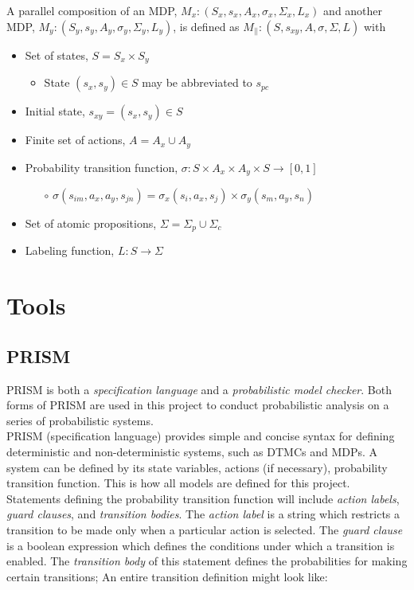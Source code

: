 \documentclass{article}
\begin{document}
\newpage

A parallel composition of an MDP, $M_x: (S_x, s_x, A_x, \sigma_x, \Sigma_x, L_x)$ and another MDP, $M_y: (S_y, s_y, A_y, \sigma_y, \Sigma_y, L_y)$, is defined as 
$M_{||}: (S, s_{xy}, A, \sigma, \Sigma, L)$ with
\begin{itemize}
    \setlength\itemsep{0em}
    \item Set of states, $S=S_x \times S_y$
        \begin{itemize}
            \item State $(s_x,s_y)\in S$ may be abbreviated to $s_{pc}$
        \end{itemize}
    \item Initial state, $s_{xy} = (s_x,s_y) \in S$
    \item Finite set of actions, $A=A_x\cup A_y$
    \item Probability transition function, $\sigma: S \times A_x \times A_y \times S \rightarrow [0, 1]$
        \begin{itemize}
            \item[$\circ$] $\sigma(s_{im}, a_x, a_y, s_{jn})=\sigma_x(s_i, a_x, s_j) \times \sigma_y(s_m, a_y, s_n)$
        \end{itemize}
    \item Set of atomic propositions, $\Sigma = \Sigma_p\cup\Sigma_c$
    \item Labeling function, $L : S\rightarrow \Sigma$
\end{itemize}

\section{Tools}
\subsection{PRISM}

PRISM is both a \textit{specification language} and a \textit{probabilistic model checker}. Both forms of PRISM are used in this project to conduct probabilistic analysis on a series of probabilistic systems. \\

PRISM (specification language) provides simple and concise syntax for defining deterministic and non-deterministic systems, such as DTMCs and MDPs. A system can be defined by its state variables, actions (if necessary), probability transition function. This is how all models are defined for this project. Statements defining the probability transition function will include \textit{action labels}, \textit{guard clauses}, and \textit{transition bodies}. The \textit{action label} is a string which restricts a transition to be made only when a particular action is selected. The \textit{guard clause} is a boolean expression which defines the conditions under which a transition is enabled. The \textit{transition body} of this statement defines the probabilities for making certain transitions; An entire transition definition might look like:
\end{document}
